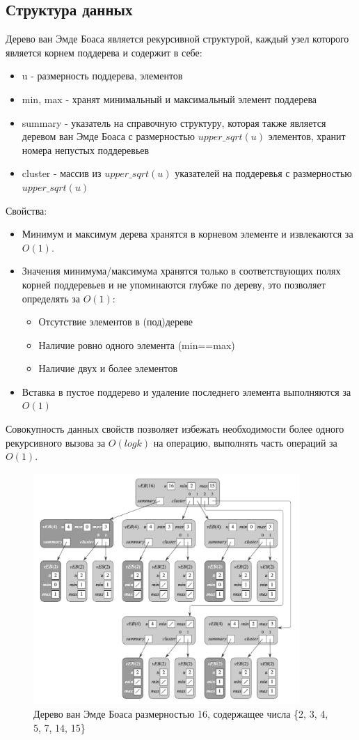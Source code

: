 \documentclass{article}
\begin{document}
\subsection{Структура данных}
Дерево ван Эмде Боаса является рекурсивной структурой, каждый узел которого является корнем поддерева и содержит в себе:
\begin{itemize}
    \item u - размерность поддерева, элементов
    \item min, max - хранят минимальный и максимальный элемент поддерева
    \item summary - указатель на справочную структуру, которая также является деревом ван Эмде Боаса с размерностью $upper\_sqrt(u)$ элементов, хранит номера непустых поддеревьев
    \item cluster - массив из $upper\_sqrt(u)$ указателей на поддеревья с размерностью $upper\_sqrt(u)$
\end{itemize}
Свойства:
\begin{itemize}
    \item Минимум и максимум дерева хранятся в корневом элементе и извлекаются за $O(1)$.
    \item Значения минимума/максимума хранятся только в соответствующих полях корней поддеревьев и не упоминаются глубже по дереву, это позволяет определять за $O(1)$:
    \begin{itemize}
        \item Отсутствие элементов в (под)дереве
        \item Наличие ровно одного элемента (min==max)
        \item Наличие двух и более элементов
    \end{itemize}
    \item Вставка в пустое поддерево и удаление последнего элемента выполняются за $O(1)$
\end{itemize}
Совокупность данных свойств позволяет избежать необходимости более одного рекурсивного вызова за $O(log{k})$ на операцию, выполнять часть операций за $O(1)$.
\begin{figure}[H]
    \centering
    \includegraphics[width=0.9\textwidth]{veb.png}
    \caption{Дерево ван Эмде Боаса размерностью 16, содержащее числа \{2, 3, 4, 5, 7, 14, 15\}}
\end{figure}
\end{document}
